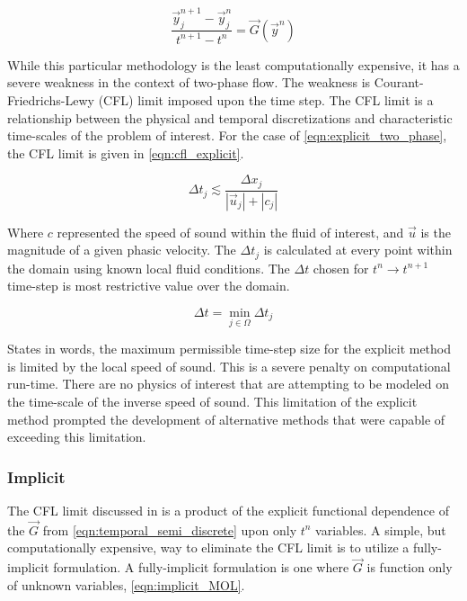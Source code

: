 \begin{equation}
\label{eqn:explicit_two_phase}
\frac{ \vec{y}^{n+1}_{j} - \vec{y}^{n}_{j}}{t^{n+1}-t^{n}} = \vec{G}(\vec{y}^{n})
\end{equation}

While this particular methodology is the least computationally expensive, it has a severe weakness in the context of two-phase flow.
The weakness is Courant-Friedrichs-Lewy (CFL) limit imposed upon the time step.
The CFL limit is a relationship between the physical and temporal discretizations and characteristic time-scales of the problem of interest.
For the case of \eqref{eqn:explicit_two_phase}, the CFL limit is given in \eqref{eqn:cfl_explicit}.

\begin{equation}
\label{eqn:cfl_explicit}
\Delta t_j \lesssim \frac{\Delta x_j}{|\vec{u}_j|+|c_j|}
\end{equation}

Where $c$ represented the speed of sound within the fluid of interest, and $\vec{u}$ is the magnitude of a given phasic velocity.
The $\Delta t_j$ is calculated at every point within the domain using known local fluid conditions.
The $\Delta t$ chosen for $t^{n} \rightarrow t^{n+1}$ time-step is most restrictive value over the domain.

\begin{equation}
\label{eqn:global_cfl}
\Delta t = \min_{j \in \Omega} \Delta t_j
\end{equation}

States in words, the maximum permissible time-step size for the explicit method is limited by the local speed of sound.
This is a severe penalty on computational run-time.
There are no physics of interest that are attempting to be modeled on the time-scale of the inverse speed of sound.
This limitation of the explicit method prompted the development of alternative methods that were capable of exceeding this limitation.

\subsubsection{Implicit}
\label{subsubsect:numerics_fully_implicit}
The CFL limit discussed in  is a product of the explicit functional dependence of the $\vec{G}$ from \eqref{eqn:temporal_semi_discrete} upon only $t^n$ variables.
A simple, but computationally expensive, way to eliminate the CFL limit is to utilize a fully-implicit formulation.
A fully-implicit formulation is one where $\vec{G}$ is function only of unknown variables, \eqref{eqn:implicit_MOL}.

